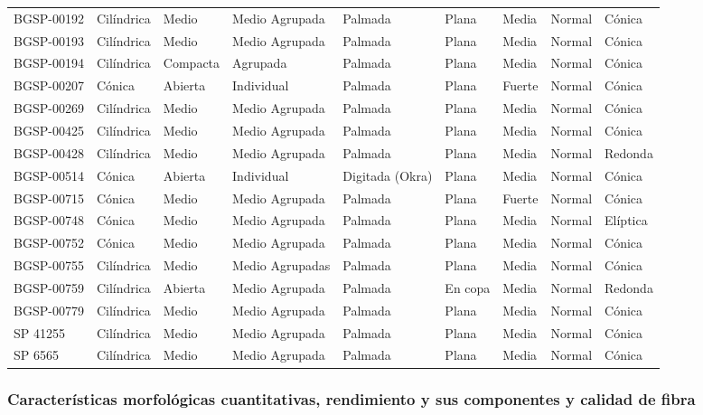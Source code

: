 \documentclass[12pt,oneside]{reedthesis}
\begin{document}
\begin{table}[!h]
{\begin{tabular}[t]{lllllllll}
\addlinespace
BGSP-00192 & Cilíndrica & Medio & Medio Agrupada & Palmada & Plana & Media & Normal & Cónica\\
BGSP-00193 & Cilíndrica & Medio & Medio Agrupada & Palmada & Plana & Media & Normal & Cónica\\
BGSP-00194 & Cilíndrica & Compacta & Agrupada & Palmada & Plana & Media & Normal & Cónica\\
BGSP-00207 & Cónica & Abierta & Individual & Palmada & Plana & Fuerte & Normal & Cónica\\
BGSP-00269 & Cilíndrica & Medio & Medio Agrupada & Palmada & Plana & Media & Normal & Cónica\\
\addlinespace
BGSP-00425 & Cilíndrica & Medio & Medio Agrupada & Palmada & Plana & Media & Normal & Cónica\\
BGSP-00428 & Cilíndrica & Medio & Medio Agrupada & Palmada & Plana & Media & Normal & Redonda\\
BGSP-00514 & Cónica & Abierta & Individual & Digitada (Okra) & Plana & Media & Normal & Cónica\\
BGSP-00715 & Cónica & Medio & Medio Agrupada & Palmada & Plana & Fuerte & Normal & Cónica\\
BGSP-00748 & Cónica & Medio & Medio Agrupada & Palmada & Plana & Media & Normal & Elíptica\\
\addlinespace
BGSP-00752 & Cónica & Medio & Medio Agrupada & Palmada & Plana & Media & Normal & Cónica\\
BGSP-00755 & Cilíndrica & Medio & Medio Agrupadas & Palmada & Plana & Media & Normal & Cónica\\
BGSP-00759 & Cilíndrica & Abierta & Medio Agrupada & Palmada & En copa & Media & Normal & Redonda\\
BGSP-00779 & Cilíndrica & Medio & Medio Agrupada & Palmada & Plana & Media & Normal & Cónica\\
SP 41255 & Cilíndrica & Medio & Medio Agrupada & Palmada & Plana & Media & Normal & Cónica\\
\addlinespace
SP 6565 & Cilíndrica & Medio & Medio Agrupada & Palmada & Plana & Media & Normal & Cónica\\
\bottomrule
\end{tabular}}
\end{table}

\subsubsection{Características morfológicas cuantitativas, rendimiento y sus componentes y calidad de fibra}\label{caracteruxedsticas-morfoluxf3gicas-cuantitativas-rendimiento-y-sus-componentes-y-calidad-de-fibra}
\end{document}
